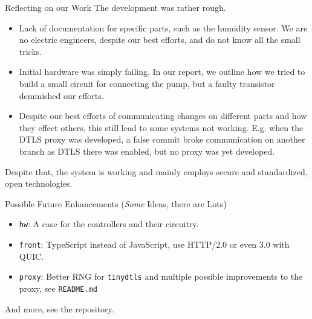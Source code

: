 \documentclass[10pt, xcolor=svgnames]{beamer}
\begin{document}
\begin{frame}{Reflecting on our Work}
    The development was rather rough.
    \begin{itemize}
        \item Lack of documentation for specific parts, such as the humidity sensor. We are no electric engineers, despite our best efforts, and do not know all the small tricks.
        \item Initial hardware was simply failing. In our report, we outline how we tried to build a small circuit for connecting the pump, but a faulty transistor deminished our efforts.
        \item Despite our best efforts of communicating changes on different parts and how they effect others, this still lead to some systems not working. E.g. when the DTLS proxy was developed, a false commit broke communication on another branch as DTLS there was enabled, but no proxy was yet developed.
    \end{itemize}

    Despite that, the system is working and mainly employs secure and standardized, open technologies.
\end{frame}

\begin{frame}{Possible Future Enhancements (\emph{Some} Ideas, there are Lots)}
    \begin{itemize}
        \item \texttt{hw}: A case for the controllers and their circuitry.
        \item \texttt{front}: TypeScript instead of JavaScript, use HTTP/2.0 or even 3.0 with QUIC.
        \item \texttt{proxy}: Better RNG for \texttt{tinydtls} and multiple possible improvements to the proxy, see \texttt{README.md}
    \end{itemize}

    And more, see the repository.
\end{frame}
\end{document}
